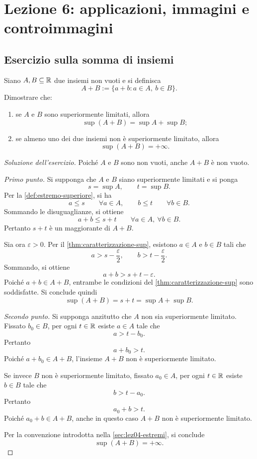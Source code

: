 \chapter[Lezione 6 --- 13 ottobre 2026]{Lezione 6: applicazioni, immagini e controimmagini}
\label{chap:lezione-06}

\section{Esercizio sulla somma di insiemi}
\label{sec:lez06-esercizio-somma-insiemi}

\begin{exercise}
\label{ex:lez06-sup-somma-insiemi}
Siano \(A,B\subseteq\mathbb{R}\) due insiemi non vuoti e si definisca
\[
  A+B:=\{a+b:a\in A,\ b\in B\}.
\]
Dimostrare che:
\begin{enumerate}
  \item se \(A\) e \(B\) sono superiormente limitati, allora
  \[
    \sup(A+B)=\sup A+\sup B;
  \]
  \item se almeno uno dei due insiemi non è superiormente limitato,
  allora
  \[
    \sup(A+B)=+\infty.
  \]
\end{enumerate}
\end{exercise}

\begin{proof}[Soluzione dell'esercizio]
Poiché \(A\) e \(B\) sono non vuoti, anche \(A+B\) è non vuoto.

\emph{Primo punto.}
Si supponga che \(A\) e \(B\) siano superiormente limitati
e si ponga
\[
  s=\sup A,
  \qquad
  t=\sup B.
\]
Per la \cref{def:estremo-superiore}, si ha
\[
  a\le s\qquad\forall a\in A,
  \qquad
  b\le t\qquad\forall b\in B.
\]
Sommando le disuguaglianze, si ottiene
\[
  a+b\le s+t
  \qquad\forall a\in A,\ \forall b\in B.
\]
Pertanto \(s+t\) è un maggiorante di \(A+B\).

Sia ora \(\varepsilon>0\). Per il
\cref{thm:caratterizzazione-sup}, esistono
\(a\in A\) e \(b\in B\) tali che
\[
  a>s-\frac{\varepsilon}{2},
  \qquad
  b>t-\frac{\varepsilon}{2}.
\]
Sommando, si ottiene
\[
  a+b>s+t-\varepsilon.
\]
Poiché \(a+b\in A+B\), entrambe le condizioni del
\cref{thm:caratterizzazione-sup} sono soddisfatte.
Si conclude quindi
\[
  \sup(A+B)=s+t=\sup A+\sup B.
\]

\emph{Secondo punto.}
Si supponga anzitutto che \(A\) non sia superiormente
limitato. Fissato \(b_0\in B\), per ogni \(t\in\mathbb{R}\)
esiste \(a\in A\) tale che
\[
  a>t-b_0.
\]
Pertanto
\[
  a+b_0>t.
\]
Poiché \(a+b_0\in A+B\), l'insieme \(A+B\) non è
superiormente limitato.

Se invece \(B\) non è superiormente limitato, fissato
\(a_0\in A\), per ogni \(t\in\mathbb{R}\) esiste \(b\in B\)
tale che
\[
  b>t-a_0.
\]
Pertanto
\[
  a_0+b>t.
\]
Poiché \(a_0+b\in A+B\), anche in questo caso
\(A+B\) non è superiormente limitato.

Per la convenzione introdotta nella \cref{sec:lez04-estremi},
si conclude
\[
  \sup(A+B)=+\infty.
\]
\end{proof}

